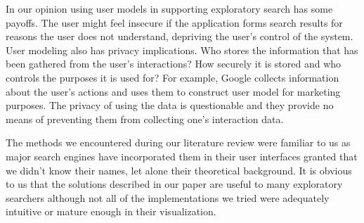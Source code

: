 \documentclass{sigchi}
\begin{document}
In our opinion using user models in supporting exploratory search has some payoffs. The user might feel insecure if the application forms search results for reasons the user does not understand, depriving the user's control of the system. User modeling also has privacy implications. Who stores the information that has been gathered from the user's interactions? How securely it is stored and who controls the purposes it is used for? For example, Google collects information about the user's actions and uses them to construct user model for marketing purposes. The privacy of using the data is questionable and they provide no means of preventing them from collecting one's interaction data. 

The methods we encountered during our literature review were familiar to us as major search engines have incorporated them in their user interfaces granted that we didn't know their names, let alone their theoretical background. It is obvious to us that the solutions described in our paper are useful to many exploratory searchers although not all of the implementations we tried were adequately intuitive or mature enough in their visualization.

\nocite{} %

%
%
%
%
%
\balance



\end{document}
